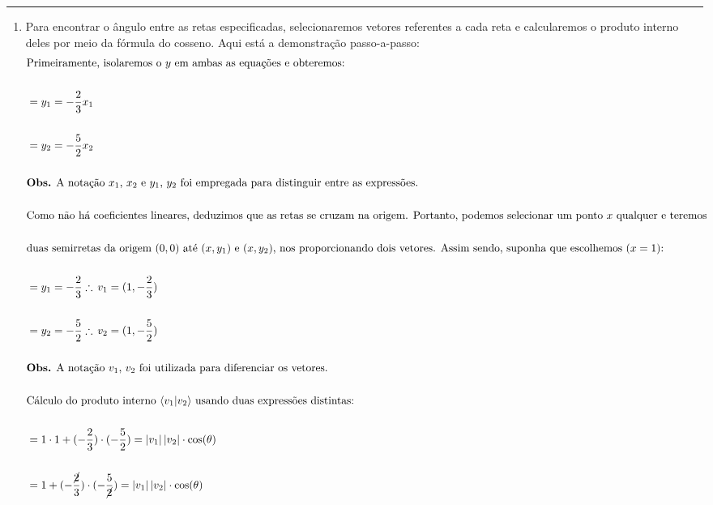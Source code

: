 \documentclass[
]{article}
\providecommand{\tightlist}{%
  \setlength{\itemsep}{0pt}\setlength{\parskip}{0pt}}
\begin{document}
\begin{center}\rule{0.5\linewidth}{0.5pt}\end{center}

\begin{enumerate}
\def\labelenumi{\arabic{enumi}.}
\setcounter{enumi}{2}
\tightlist
\item
  Para encontrar o ângulo entre as retas especificadas, selecionaremos
  vetores referentes a cada reta e calcularemos o produto interno deles
  por meio da fórmula do cosseno. Aqui está a demonstração
  passo-a-passo:\[
  \begin{flalign*}
  &\text{Primeiramente, isolaremos o $y$ em ambas as equações e obteremos:}&& \\ \\
  &=y_1=-\frac{2}{3}x_1&& \\ \\
  &=y_2=-\frac{5}{2}x_2&& \\ \\
  &\text{\textbf{Obs.} A notação $x_1,\,x_2$ e $y_1,\,y_2$ foi empregada para distinguir entre as expressões.}&& \\ \\
  &\text{Como não há coeficientes lineares, deduzimos que as retas se cruzam na origem. Portanto, podemos selecionar um ponto $x$ qualquer e teremos }&& \\ \\
  &\text{duas semirretas da origem $(0,0)$ até $(x,y_1)$ e $(x,y_2)$, nos proporcionando dois vetores. Assim sendo, suponha que escolhemos $(x=1)$:}&& \\ \\
  &=y_1=-\frac{2}{3}\therefore\,v_1=(1,-\frac{2}{3})&& \\ \\
  &=y_2=-\frac{5}{2}\therefore\,v_2=(1,-\frac{5}{2})&& \\ \\
  &\text{\textbf{Obs.} A notação $v_1,\,v_2$ foi utilizada para diferenciar os vetores.}&& \\ \\
  &\text{Cálculo do produto interno $\langle v_1|v_2\rangle$ usando duas expressões distintas:}&& \\ \\
  &=1\cdot 1+(-\frac{2}{3})\cdot (-\frac{5}{2})=|v_1|\,|v_2|\cdot\cos(\theta)&& \\ \\
  &=1+(-\frac{\cancel{2}}{3})\cdot (-\frac{5}{\cancel{2}})=|v_1|\,|v_2|\cdot\cos(\theta)&& \\ \\

\end{flalign*}\]
\end{enumerate}
\end{document}
